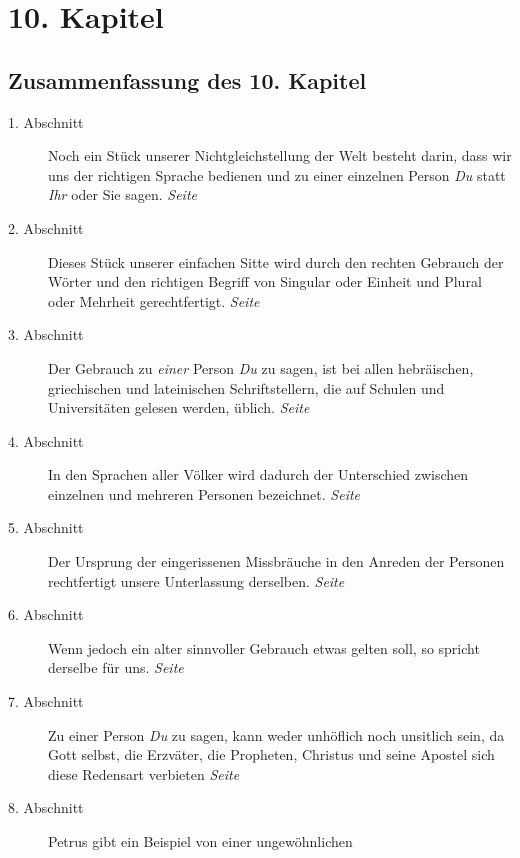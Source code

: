 
\chapter{10. Kapitel} \label{kap10}
\section{Zusammenfassung des 10. Kapitel}


\begin{description}
\item[1. Abschnitt] Noch ein Stück unserer Nichtgleichstellung der Welt besteht
darin, dass wir uns der richtigen Sprache bedienen und zu einer einzelnen Person
\textit{Du} statt \textit{Ihr} oder Sie sagen.
\dotfill \textit{Seite~\pageref{kap10_ab1}}\\
\item[2. Abschnitt] Dieses Stück unserer einfachen Sitte wird durch den rechten
Gebrauch der Wörter und den richtigen Begriff von Singular oder Einheit und
Plural oder Mehrheit gerechtfertigt.
\dotfill \textit{Seite~\pageref{kap10_ab2}}\\
\item[3. Abschnitt] Der Gebrauch zu \textit{einer} Person \textit{Du} zu sagen,
ist bei
allen hebräischen, griechischen und lateinischen Schriftstellern, die auf
Schulen und Universitäten gelesen werden, üblich.
\dotfill \textit{Seite~\pageref{kap10_ab3}}\\
\item[4. Abschnitt] In den Sprachen aller Völker wird dadurch der Unterschied
zwischen einzelnen und mehreren Personen bezeichnet.
\dotfill \textit{Seite~\pageref{kap10_ab4}}\\
\item[5. Abschnitt] Der Ursprung der eingerissenen Missbräuche in den Anreden der
Personen rechtfertigt unsere Unterlassung derselben.
\dotfill \textit{Seite~\pageref{kap10_ab5}}\\
\item[6. Abschnitt] Wenn jedoch ein alter sinnvoller Gebrauch etwas gelten
soll, so spricht derselbe für uns.
\dotfill \textit{Seite~\pageref{kap10_ab6}}\\
\item[7. Abschnitt] Zu einer Person \textit{Du} zu sagen, kann weder unhöflich
noch
unsitlich sein, da Gott selbst, die Erzväter, die Propheten, Christus und
seine Apostel sich diese Redensart verbieten
\dotfill \textit{Seite~\pageref{kap10_ab7}}\\
\item[8. Abschnitt] Petrus gibt ein Beispiel von einer ungewöhnlichen

\end{description}
